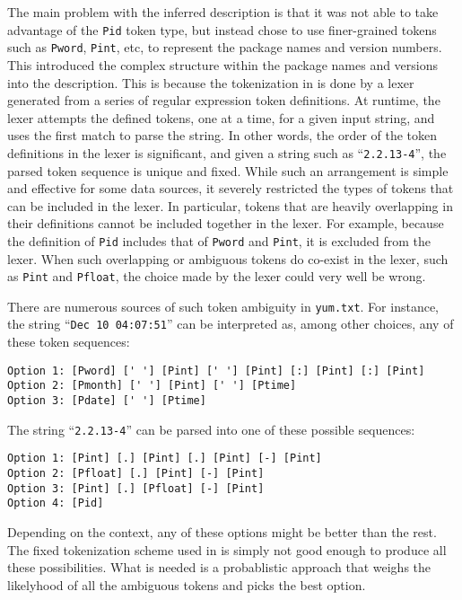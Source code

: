 The main problem with the inferred description is that it was not
able to take advantage of the {\tt Pid} token type, but instead chose
to use finer-grained tokens such as {\tt Pword}, {\tt Pint}, etc,
to represent the package names and version numbers. This introduced the
complex structure within the package names and versions into the
description. This is because the tokenization in \learnpads{} is done by
a lexer generated from a series of regular expression token definitions.
At runtime, the lexer attempts the defined tokens, one at
a time, for a given input string, and uses the first match to parse the
string.  In other words, the order of the token definitions in the lexer
is significant, and given a string such as ``{\tt 2.2.13-4}'', the parsed
token sequence is unique and fixed. While such an arrangement is simple
and effective for some data sources, it severely restricted the types of
tokens that can be included in the lexer. In particular, tokens that are
heavily overlapping in their definitions cannot be included together in the lexer.
For example, because the definition of {\tt Pid} includes that of
{\tt Pword} and  {\tt Pint}, it is excluded from the lexer. 
When such overlapping or ambiguous tokens do co-exist in the lexer, such as
{\tt Pint} and {\tt Pfloat},
the choice made by the lexer could very well be wrong.

There are numerous sources of such token ambiguity 
in {\tt yum.txt}. For instance, the string ``{\tt Dec 10 04:07:51}'' 
can be interpreted as, among other choices, any of these
token sequences:

{\small
\begin{verbatim}
Option 1: [Pword] [' '] [Pint] [' '] [Pint] [:] [Pint] [:] [Pint]
Option 2: [Pmonth] [' '] [Pint] [' '] [Ptime]
Option 3: [Pdate] [' '] [Ptime]
\end{verbatim}
}

The string ``{\tt 2.2.13-4}'' can be parsed into one of 
these possible sequences:
{\small
\begin{verbatim}
Option 1: [Pint] [.] [Pint] [.] [Pint] [-] [Pint]
Option 2: [Pfloat] [.] [Pint] [-] [Pint]
Option 3: [Pint] [.] [Pfloat] [-] [Pint]
Option 4: [Pid]
\end{verbatim}
}

Depending on the context, any of these options might be better than
the rest.  The fixed tokenization scheme used in \learnpads{} is simply
not good enough to produce all these possibilities. What is needed
is a probablistic approach that weighs the likelyhood of all the ambiguous
tokens and picks the best option.
